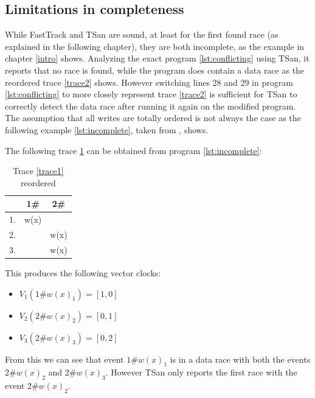 \documentclass[12pt]{article}
\begin{document}
	\subsection{Limitations in completeness}
	While FastTrack and TSan are sound, at least for the first found race (as explained in the following chapter), they are both incomplete, as the example in chapter \ref{intro} shows. Analyzing the exact program \ref{lst:conflicting} using TSan, it reports that no race is found, while the program does contain a data race as the reordered trace \ref{trace2} shows. However switching lines 28 and 29 in program \ref{lst:conflicting} to more closely represent trace \ref{trace2} is sufficient for TSan to correctly detect the data race after running it again on the modified program.\\
	The assumption that all writes are totally ordered is not always the case as the following example \ref{lst:incomplete}, taken from \cite[p. 10]{sulzmann2}, shows.\\
	\begin{minipage}{\linewidth}
		
	\end{minipage}
	The following trace \ref{trace4} can be obtained from program \ref{lst:incomplete}:
	\begin{table}[H]
		\begin{center}
			\begin{tabular}{ c c c}
				& 1\# & 2\# \\
				\hline
				1. & w(x) & \\
				2. & & w(x) \\
				3. & & w(x) \\
			\end{tabular}
			\caption{Trace \ref{trace1} reordered}
			\label{trace4}
		\end{center}
	\end{table}
	This produces the following vector clocks:
	\begin{itemize}
		\item $V_1(1\#w(x)_1) = [1,0]$
		\item $V_2(2\#w(x)_2) = [0,1]$
		\item $V_3(2\#w(x)_3) = [0,2]$
	\end{itemize}
	From this we can see that event $1\#w(x)_1$ is in a data race with both the events $2\#w(x)_2$ and $2\#w(x)_3$. However TSan only reports the first race with the event $2\#w(x)_2$.
\end{document}
